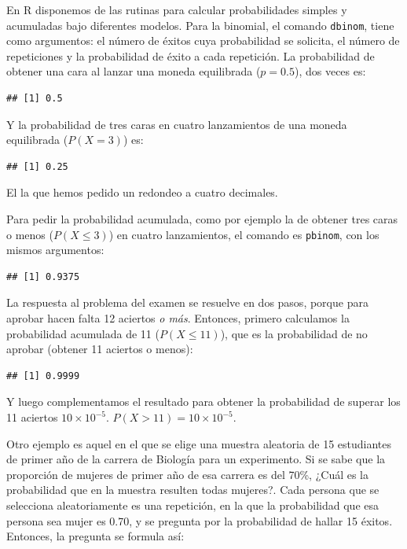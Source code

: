 \documentclass[]{book}
\begin{document}
En R disponemos de las rutinas para calcular probabilidades simples y acumuladas bajo diferentes modelos. Para la binomial, el comando \texttt{dbinom}, tiene como argumentos: el número de éxitos cuya probabilidad se solicita, el número de repeticiones y la probabilidad de éxito a cada repetición. La probabilidad de obtener una cara al lanzar una moneda equilibrada (\(p=0.5\)), dos veces es:

\begin{verbatim}
## [1] 0.5
\end{verbatim}

Y la probabilidad de tres caras en cuatro lanzamientos de una moneda equilibrada (\(P(X=3)\)) es:

\begin{verbatim}
## [1] 0.25
\end{verbatim}

El la que hemos pedido un redondeo a cuatro decimales.

Para pedir la probabilidad acumulada, como por ejemplo la de obtener tres caras o menos (\(P(X\leq 3)\)) en cuatro lanzamientos, el comando es \texttt{pbinom}, con los mismos argumentos:

\begin{verbatim}
## [1] 0.9375
\end{verbatim}

La respuesta al problema del examen se resuelve en dos pasos, porque para aprobar hacen falta 12 aciertos \emph{o más}. Entonces, primero calculamos la probabilidad acumulada de 11 (\(P(X\leq 11)\)), que es la probabilidad de no aprobar (obtener 11 aciertos o menos):

\begin{verbatim}
## [1] 0.9999
\end{verbatim}

Y luego complementamos el resultado para obtener la probabilidad de superar los 11 aciertos \ensuremath{10\times 10^{-5}}. \(P(X>11)=\)\ensuremath{10\times 10^{-5}}.

Otro ejemplo es aquel en el que se elige una muestra aleatoria de 15 estudiantes de primer año de la carrera de Biología para un experimento. Si se sabe que la proporción de mujeres de primer año de esa carrera es del 70\%, ¿Cuál es la probabilidad que en la muestra resulten todas mujeres?. Cada persona que se selecciona aleatoriamente es una repetición, en la que la probabilidad que esa persona sea mujer es 0.70, y se pregunta por la probabilidad de hallar 15 éxitos. Entonces, la pregunta se formula así:
\end{document}
